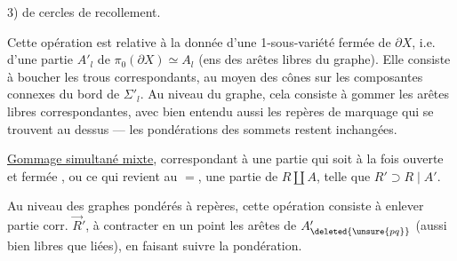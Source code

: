 
3)   de cercles de recollement.

Cette opération est relative à la donnée d'une 1-sous-variété fermée de $\partial X$, i.e. d'une partie $A'_l$ de $\pi_0(\partial X)\simeq A_l$ (ens des arêtes libres du graphe).
Elle consiste à boucher les trous correspondants, au moyen des cônes sur les composantes connexes du bord de $\Sigma'_l$.
Au niveau du graphe, cela consiste à gommer les arêtes libres correspondantes, avec bien entendu aussi les repères de marquage qui se trouvent au dessus ---  les pondérations des sommets restent inchangées.

\uline{Gommage simultané mixte},  correspondant à une partie
    
qui soit à la fois ouverte et fermée  
\unsure{,}
,
\unsure{,}
ou ce qui revient au $=$, une partie  de $R\amalg A$, telle que $R'\supset R\mid A'$.

Au niveau des graphes pondérés à repères, cette opération consiste à enlever   partie corr. $\vec R'$, à contracter en un point les arêtes de $A'_{\deleted{\unsure{pq}}}$ (aussi bien libres que liées), en faisant suivre la pondération.

